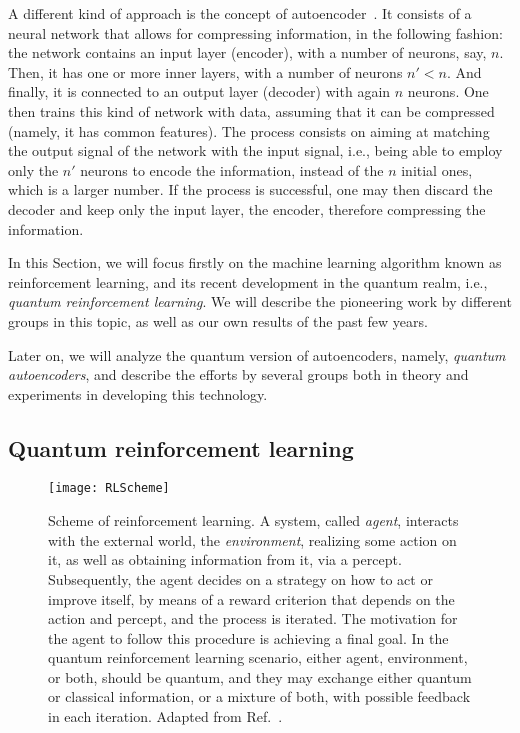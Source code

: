 \documentclass[12pt]{iopart}
\begin{document}
A different kind of approach is the concept of autoencoder~\cite{HintonNature}. It consists of a neural network that allows for compressing information, in the following fashion: the network contains an input layer (encoder), with a number of neurons, say, $n$. Then, it has one or more inner layers, with a number of neurons $n'<n$. And finally, it is connected to an output layer (decoder) with again $n$ neurons. One then trains this kind of network with data, assuming that it can be compressed (namely, it has common features). The process consists on aiming at matching the output signal of the network with the input signal, i.e., being able to employ only the $n'$ neurons to encode the information, instead of the $n$ initial ones, which is a larger number. If the process is successful, one may then discard the decoder and keep only the input layer, the encoder, therefore compressing the information.

In this Section, we will focus firstly on the machine learning algorithm known as reinforcement learning, and its recent development in the quantum realm, i.e., {\it quantum reinforcement learning}. We will describe the pioneering work by different groups in this topic, as well as our own results of the past few years.

Later on, we will analyze the quantum version of autoencoders, namely, {\it quantum autoencoders}, and describe the efforts by several groups both in theory and experiments in developing this technology.

\subsection{Quantum reinforcement learning}

\begin{figure}[h!]
\begin{center}
\texttt{[image: RLScheme]}
\caption{Scheme of reinforcement learning. A system, called {\it agent}, interacts with the external world, the {\it environment}, realizing some action on it, as well as obtaining information from it, via a percept. Subsequently, the agent decides on a strategy on how to act or improve itself, by means of a reward criterion that depends on the action and percept, and the process is iterated. The motivation for the agent to follow this procedure is achieving a final goal. In the quantum reinforcement learning scenario, either agent, environment, or both, should be quantum, and they may exchange either quantum or classical information, or a mixture of both, with possible feedback in each iteration. Adapted from Ref.~\cite{LamataQRL}.}
\label{RLScheme}
\end{center}
\end{figure} 
\end{document}
